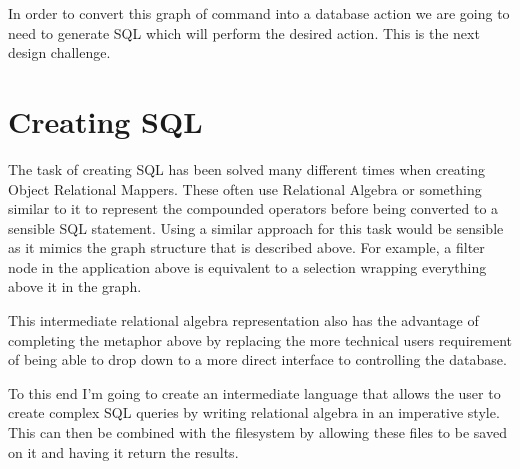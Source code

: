 In order to convert this graph of command into a database action we are going to need to generate \ac{SQL} which will perform the desired action. This is the next design challenge.

\section{Creating SQL}

The task of creating \ac{SQL} has been solved many different times when creating Object Relational Mappers. These often use Relational Algebra or something similar to it to represent the compounded operators before being converted to a sensible SQL statement. Using a similar approach for this task would be sensible as it mimics the graph structure that is described above. For example, a filter node in the application above is equivalent to a selection wrapping everything above it in the graph.

This intermediate relational algebra representation also has the advantage of completing the metaphor above by replacing the more technical users requirement of being able to drop down to a more direct interface to controlling the database.

To this end I'm going to create an intermediate language that allows the user to create complex \ac{SQL} queries by writing relational algebra in an imperative style. This can then be combined with the filesystem by allowing these files to be saved on it and having it return the results.